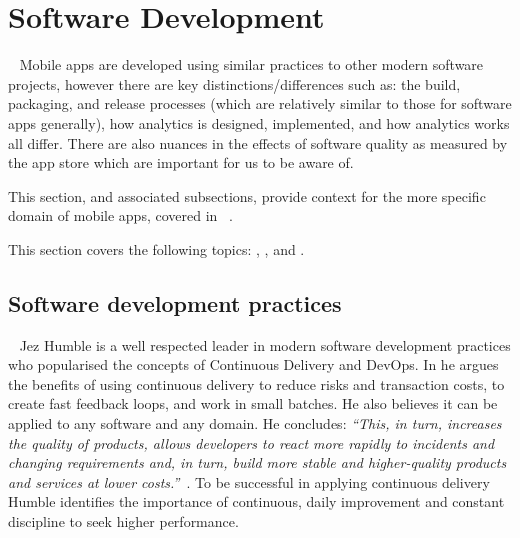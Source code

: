 

\section{Software Development}~\label{rw-software-development-section}
Mobile apps are developed using similar practices to other modern software projects, however there are key distinctions/differences such as: the build, packaging, and release processes (which are relatively similar to those for software apps generally), how analytics is designed, implemented, and how analytics works all differ. There are also nuances in the effects of software quality as measured by the app store which are important for us to be aware of.

This section, and associated subsections, provide context for the more specific domain of mobile apps, covered in ~.
 
This section covers the following topics: , , and .

\subsection{Software development practices}~\label{rw-software-development-practices-topic}
Jez Humble is a well respected leader in modern software development practices who popularised the concepts of Continuous Delivery and DevOps. In  he argues the benefits of using continuous delivery to reduce risks and transaction costs, to create fast feedback loops, and work in small batches. He also believes it can be applied to any software and any domain. He concludes: \emph{``This, in turn, increases the quality of products, allows developers to react more rapidly to incidents and changing requirements and, in turn, build more stable and higher-quality products and services at lower costs.''}~. To be successful in applying continuous delivery Humble identifies the importance of continuous, daily improvement and constant discipline to seek higher performance. 

